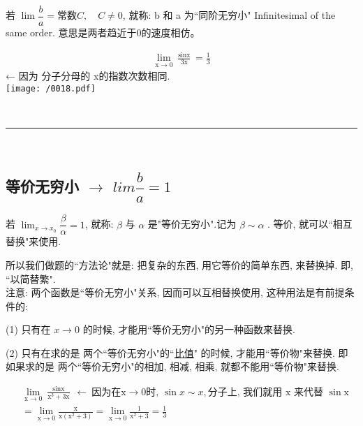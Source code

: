 \documentclass[UTF8]{ctexart}
\begin{document}
若 $\lim \dfrac{b} {a}= \text{常数}C, \quad C \ne 0 $, 就称: b 和 a 为``同阶无穷小" Infinitesimal of the same order. 意思是两者趋近于0的速度相仿。

\begin{myEnvSample}
\begin{align*}  %
	\lim_{\text{x}\rightarrow 0}\frac{\sin\text{x}}{3\text{x}}=\frac{1}{3}  
\end{align*} ← 因为 分子分母的 x的指数次数相同. \\

\texttt{[image: /0018.pdf]}
\end{myEnvSample}


~\\
\hrule
~\\


\subsection{等价无穷小 $\to$ $lim \dfrac{b} {a}=1$} 

若 $\lim_{x \rightarrow x_0} \dfrac{\beta} {\alpha} = 1$, 就称: $\beta$ 与 $\alpha$ 是"等价无穷小".记为  $\beta \sim \alpha$ . 等价, 就可以``相互替换"来使用. 

所以我们做题的``方法论"就是: 把复杂的东西, 用它等价的简单东西, 来替换掉. 即, ``以简替繁". \\

注意: 两个函数是``等价无穷小"关系, 因而可以互相替换使用, 这种用法是有前提条件的:

(1) 只有在  $x \to 0$  的时候, 才能用``等价无穷小"的另一种函数来替换.

(2) 只有在求的是 两个``等价无穷小"的``\underline{比值}" 的时候, 才能用``等价物"来替换. 即如果求的是 两个``等价无穷小"的相加, 相减, 相乘, 就都不能用``等价物"来替换. \\

\begin{myEnvSample}
\begin{align*}  %
	&\lim_{\text{x}\rightarrow 0}\frac{\sin\text{x}}{\text{x}^3+3\text{x}}\ \gets \ \text{因为在x}\rightarrow 0\text{时,\ }\sin x \sim x, \text{分子上,\ 我们就用\ x\ 来代替\ }\sin\text{x}\\
	&=\lim_{\text{x}\rightarrow 0}\frac{\text{x}}{\text{x}\left( \text{x}^2+3 \right)}=\lim_{\text{x}\rightarrow 0}\frac{1}{\text{x}^2+3}=\frac{1}{3}
\end{align*}
\end{myEnvSample}
\end{document}
